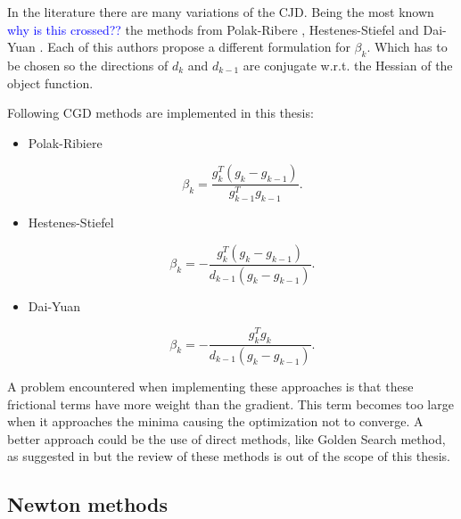 In the literature there are many variations of the CJD. Being the most known \textcolor{blue}{why is this crossed?? } the methods from Polak-Ribere \cite{polak},  Hestenes-Stiefel \cite{hestenes} and Dai-Yuan \cite{dai}. Each of this authors propose a different formulation for $\beta_k$. Which has to be chosen so the directions of $d_{k}$ and $d_{k-1}$ are conjugate w.r.t. the Hessian of the object function.

Following CGD methods are implemented in this thesis:

\begin{itemize}
	\item Polak-Ribiere
	
	\begin{equation}
	\beta_k = \frac{ g_k^{T} (g_k - g_{k-1})}{ g_{k-1}^{T} g_{k-1}}	.
	\end{equation}
	
	\item Hestenes-Stiefel
	
	\begin{equation}
	\beta_k = - \frac{ g_k^{T} (g_k - g_{k-1})}{d_{k-1} (g_k - g_{k-1})}	.
	\end{equation}	
	
	\item Dai-Yuan
	
	\begin{equation}
	\beta_k =- \frac{ g_k^{T} g_k }{d_{k-1} (g_k - g_{k-1})}		.
	\end{equation}
	
	
\end{itemize}






A problem encountered when implementing these approaches is that these frictional terms have more weight than the gradient. This term becomes too large when it approaches the minima causing the optimization not to converge. A better approach could be the use of direct methods, like Golden Search method, as suggested in \cite{CGD_converge} but the review of these methods is out of the scope of this thesis.











\subsection{Newton methods}
\label{subsec:newton}

